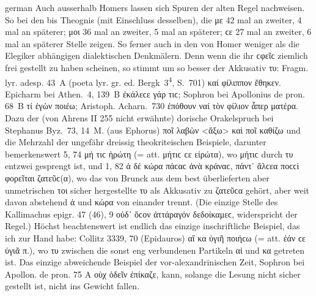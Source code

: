 \begin{otherlanguage*}{german}
Auch ausserhalb Homers lassen sich Spuren der alten Regel nachweisen. So bei den  bis Theognis (mit Einschluss desselben), die με 42 mal an zweiter, 4 mal an späterer; μοι 36 mal an zweiter, 5 mal an späterer; ϲε 27 mal an zweiter, 6 mal an späterer Stelle zeigen. So ferner auch in den von Homer weniger als die Elegiker abhängigen dialektischen Denkmälern. Denn wenn die  ihr ϲφεῖϲ ziemlich frei gestellt zu haben scheinen, so stimmt um so besser der  Akkusativ τυ: Fragm. lyr. adesp. 43~Α (poeta lyr. gr. ed. Bergk~3\textsuperscript{4}, S.~701) καί  φίλιππον ἔθηκεν. Epicharm bei Athen.~4, 139~Β ἐκάλεϲε γάρ  τιϲ; Sophron bei Apollonius de pron. 68~Β τί  ἐγὼν ποιέω; Aristoph. Acharn.~730 ἐπόθουν  ναί τὸν φίλιον ἇπερ ματέρα. Dazu der (von Ahrens II 255 nicht erwähnte) dorische Orakelspruch bei Stephanus Byz.~73, 14~M. (aus Ephorus) ποῖ  λαβὼν <ἄξω> καὶ ποῖ  καθίζω und die Mehrzahl der ungefähr dreissig theokriteischen Beispiele, darunter bemerkenswert 5, 74 μή  τιϲ ἠρώτη (= att. μήτιϲ ϲε εἰρώτα), wo μήτιϲ durch τυ entzwei gesprengt ist, und 1, 82 ἁ δέ  κώρα πάϲαϲ ἀνὰ κράναϲ, πάντ᾽ ἄλϲεα ποϲϲὶ φορεῖται ζατεῦϲ(α), wo das von Brunck aus dem best überlieferten aber unmetrischen τοι sicher hergestellte τυ als Akkusativ zu ζατεῦϲα gehört, aber weit davon abstehend ἁ und κώρα von einander trennt. (Die einzige Stelle des Kallimachus epigr. 47 (46), 9 οὐδ᾽ ὅϲον ἀττάραγόν  δεδοίκαμεϲ, widerspricht der Regel.) Höchst beachtenswert ist endlich das einzige inschriftliche Beispiel, das ich zur Hand habe: Collitz 3339, 70 (Epidauros) αἴ  κα ὑγιῆ ποιήϲω (= att. ἐάν ϲε ὑγιᾶ π.), wo τυ zwischen die sonst eng verbundenen Partikeln αἰ und κα getreten ist. Das einzige abweichende Beispiel der vor-alexandrinischen Zeit, Sophron bei Apollon. de pron. 75 Α οὐχ ὁδεῖν  ἐπίκαζε, kann, solange die Lesung nicht sicher gestellt ist, nicht ins Gewicht fallen.


\end{otherlanguage*}
